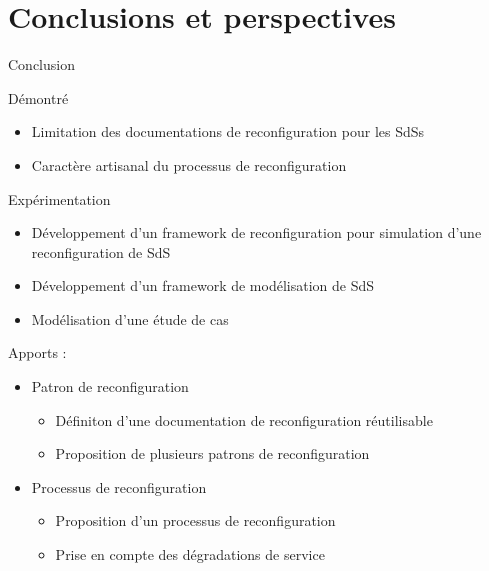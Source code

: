 \section{Conclusions et perspectives}



\begin{frame}{Conclusion}

Démontré
\begin{itemize}
\item Limitation des documentations de reconfiguration pour les SdSs
\item Caractère artisanal du processus de reconfiguration
\end{itemize}

Expérimentation 
\begin{itemize}
\item Développement d'un framework de reconfiguration  pour simulation d'une
reconfiguration de SdS
\item Développement d'un framework de modélisation de SdS
\item Modélisation d'une étude de cas 
\end{itemize} 

Apports :
\begin{itemize}
\item Patron de reconfiguration 
\begin{itemize}
\item Définiton d'une documentation de reconfiguration réutilisable
\item Proposition de plusieurs patrons de reconfiguration
\end{itemize}
\item Processus de reconfiguration 
\begin{itemize}
\item Proposition d'un processus de reconfiguration
\item Prise en compte des dégradations de service
\end{itemize}
\end{itemize}
\end{frame}
